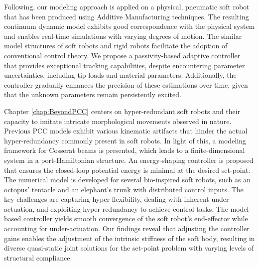 Following, our modeling approach is applied on a physical, pneumatic soft robot that has been produced using Additive Manufacturing techniques. The resulting continuum dynamic model exhibits good correspondence with the physical system and enables real-time simulations with varying degrees of motion. The similar model structures of soft robots and rigid robots facilitate the adoption of conventional control theory. We propose a passivity-based adaptive controller that provides exceptional tracking capabilities, despite encountering parameter uncertainties, including tip-loads and material parameters. Additionally, the controller gradually enhances the precision of these estimations over time, given that the unknown parameters remain persistently excited.

Chapter \ref{chap:BeyondPCC} centers on hyper-redundant soft robots and their capacity to imitate intricate morphological movements observed in nature. Previous PCC models exhibit various kinematic artifacts that hinder the actual hyper-redundancy commonly present in soft robots. In light of this, a modeling framework for Cosserat beams is presented, which leads to a finite-dimensional system in a port-Hamiltonian structure. An energy-shaping controller is proposed that ensures the closed-loop potential energy is minimal at the desired set-point. The numerical model is developed for several bio-inspired soft robots, such as an octopus' tentacle and an elephant's trunk with distributed control inputs. The key challenges are capturing hyper-flexibility, dealing with inherent under-actuation, and exploiting hyper-redundancy to achieve control tasks. The model-based controller yields smooth convergence of the soft robot's end-effector while accounting for under-actuation. Our findings reveal that adjusting the controller gains enables the adjustment of the intrinsic stiffness of the soft body, resulting in diverse quasi-static joint solutions for the set-point problem with varying levels of structural compliance. 

